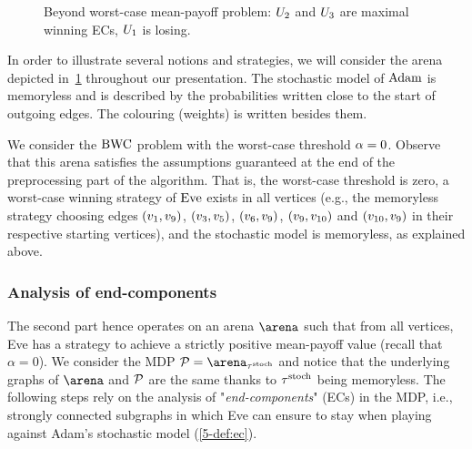 \begin{example}
\begin{figure}[tbh]
{}
      \caption{Beyond worst-case mean-payoff problem: $U_{2}$ and $U_{3}$ are maximal winning ECs, $U_{1}$ is losing.}
\label{13-fig:bwcRunningExample}
  \end{figure}

In order to illustrate several notions and strategies, we will consider the arena depicted in~\cref{13-fig:bwcRunningExample} throughout our presentation. The stochastic model of $\text{Adam}$ is memoryless and is described by the probabilities written close to the start of outgoing edges. The colouring (weights) is written besides them.

We consider the $\text{BWC}$ problem with the worst-case threshold $\alpha = 0$. Observe that this arena satisfies the assumptions guaranteed at the end of the preprocessing part of the algorithm. That is, the worst-case threshold is zero, a worst-case winning strategy of $\text{Eve}$ exists in all vertices (e.g., the memoryless strategy choosing edges $(v_{1}, v_{9})$, $(v_{3}, v_{5})$, $(v_{6}, v_{9})$, $(v_{9}, v_{10})$ and $(v_{10}, v_{9})$ in their respective starting vertices), and the stochastic model is memoryless, as explained above.
\end{example}


\subsubsection*{Analysis of end-components} The second part hence operates on an arena $\arena$ such that from all vertices, Eve has a strategy to achieve a strictly positive mean-payoff value (recall that $\alpha = 0$). We consider the MDP $\markovProcess = \arena_{\stratStoch}$ and notice that the underlying graphs of $\arena$ and ${\mathcal{P}} $ are the same thanks to $\tau^{\text{stoch}} $ being memoryless. The following steps rely on the analysis of "\textit{end-components}" (ECs) in the MDP, i.e., strongly connected subgraphs in which Eve can ensure to stay when playing against Adam's stochastic model (\cref{5-def:ec}).

